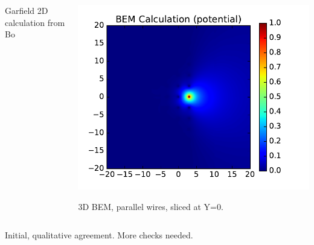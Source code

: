 \documentclass[xcolor=dvipsnames]{beamer}
\begin{document}
\begin{frame}
\begin{columns}
\begin{column}{0.5\textwidth}
\begin{center}
        \scriptsize Garfield 2D calculation from Bo
      \end{center}
    \end{column}
    \begin{column}{0.5\textwidth}
      \begin{center}
        \includegraphics[height=0.65\textheight]{parallel-near-d11.pdf}

        \scriptsize 3D BEM, parallel wires, sliced at Y=0.
      \end{center}
    \end{column}
  \end{columns}

  \begin{center}
    Initial, qualitative agreement.  More checks needed.
  \end{center}

\end{frame}
\end{document}
